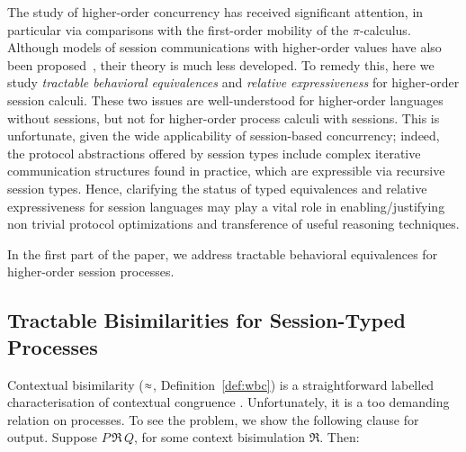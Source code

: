 The study of higher-order concurrency has received significant attention, in particular via 
comparisons with the first-order mobility of the $\pi$-calculus. Although models of session 
communications with higher-order values have also been proposed~\cite{Mostrous,VascoSimon},
their theory is much less developed.
To remedy this, here we study
 \emph{tractable behavioral equivalences} and \emph{relative expressiveness}
for higher-order session calculi. 
These two issues are well-understood for higher-order languages without sessions,
but not for higher-order process calculi with sessions.
This is unfortunate, given the wide applicability of session-based concurrency; indeed,
the protocol abstractions offered by 
session types include 
complex 
iterative communication structures found in practice, which are expressible via recursive session types.
Hence, clarifying the status of typed equivalences and relative expressiveness for session languages
may play a vital role in enabling/justifying non trivial protocol optimizations and transference of useful reasoning techniques.

In the first part of the paper, we address tractable behavioral equivalences
for higher-order session processes.

\subsection{Tractable Bisimilarities for Session-Typed Processes}
\label{subsec:intro:bisimulation}
\noi 
{}
Contextual bisimilarity ($\approx$, Definition~\ref{def:wbc}) is 
a straightforward labelled characterisation of contextual congruence 
\cite{SaWabook}. 
Unfortunately, it is a too demanding relation on processes. 
To see the problem, we show 
the following clause for output.
Suppose $P \,\Re\, Q$, for some context bisimulation $\Re$. Then:

\smallskip 

